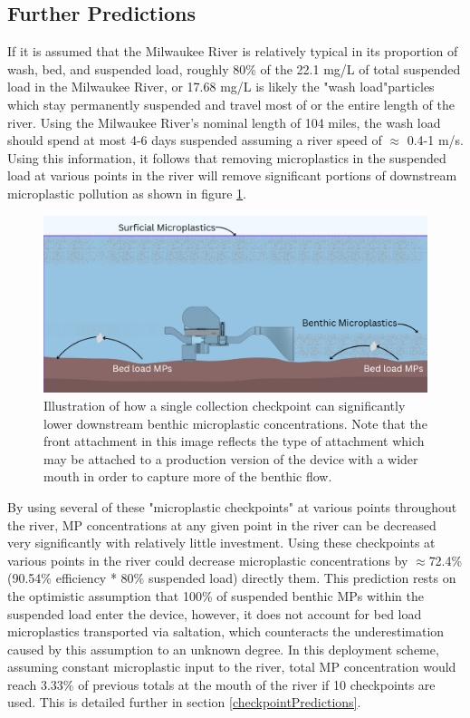 \documentclass[fleqn,10pt]{SelfArx} %
\begin{document}
	\subsection{Further Predictions}	
	\label{sec:furtherPredictions}
	If it is assumed that the Milwaukee River is relatively typical in its proportion of wash, bed, and suspended load, roughly 80\% of the 22.1 mg/L of total suspended load in the Milwaukee River, or 17.68 mg/L is likely the "wash load"\textemdash particles which stay permanently suspended and travel most of or the entire length of the river. Using the Milwaukee River's nominal length of 104 miles, the wash load should spend at most 4-6 days suspended assuming a river speed of $\approx$ 0.4-1 m/s. 
	\linebreak
	Using this information, it follows that removing microplastics in the suspended load at various points in the river will remove significant portions of downstream microplastic pollution as shown in figure \ref{fig:washload}.
	\begin{figure}[h]
		\centering
		\includegraphics[width=1\linewidth]{Figures/WashLoadCollection}
		\caption[Wash Load MP Collection]{Illustration of how a single collection checkpoint can significantly lower downstream \gls{benthic} microplastic concentrations. Note that the front attachment in this image reflects the type of attachment which may be attached to a production version of the device with a wider mouth in order to capture more of the \gls{benthic} flow.}
		\label{fig:washload}
	\end{figure}
	By using several of these "microplastic checkpoints" at various points throughout the river, MP concentrations at any given point in the river can be decreased very significantly with relatively little investment. Using these checkpoints at various points in the river could decrease microplastic concentrations by $\approx$72.4\% (90.54\% efficiency * 80\% suspended load) directly  them. This prediction rests on the optimistic assumption that 100\% of suspended \gls{benthic} MPs within the suspended load enter the device, however, it does not account for bed load microplastics transported via \gls{saltation}, which counteracts the underestimation caused by this assumption to an unknown degree. In this deployment scheme, assuming constant microplastic input to the river, total MP concentration would reach 3.33\% of previous totals at the mouth of the river if 10 checkpoints are used. This is detailed further in section \ref{checkpointPredictions}.
	
\end{document}
